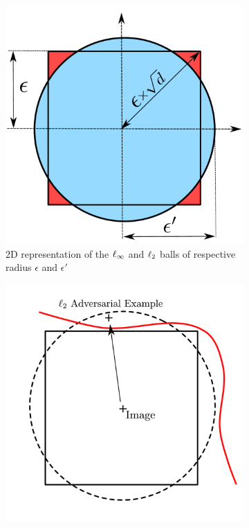 \begin{figure}
   \centering
   \begin{subfigure}[t]{0.32\textwidth}
       \centering
       \includegraphics[scale=0.22]{figures/appendix/ap4-advocating_for_multiple_defense_strategies/ball_inclusion_adversarial_training.pdf}
       \caption{2D representation of the $\ell_\infty $ and $\ell_2 $ balls of respective radius $\epsilon$ and $\epsilon'$}
       \label{figure:ap4-ball_inclusion_adversarial_training}
   \end{subfigure}
   \hfill
   \begin{subfigure}[t]{0.32\textwidth}
       \centering
       \includegraphics[scale=0.22]{figures/appendix/ap4-advocating_for_multiple_defense_strategies/ball_adversarial_l2.pdf}

\end{subfigure}
\end{figure}
